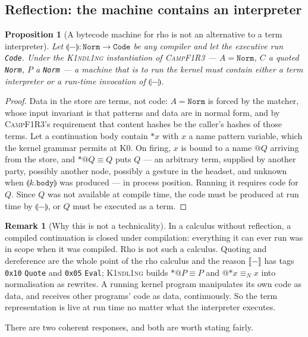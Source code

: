 \documentclass[11pt,a4paper]{article}
\newcommand{\code}[1]{\texttt{#1}}
\newcommand{\Kind}{\textsc{K1ndl1ng}}
\newcommand{\Camp}{\textsc{CampF1R3}}
\newcommand{\enc}[1]{\llbracket #1 \rrbracket}
\newcommand{\cmp}[1]{\llparenthesis #1 \rrparenthesis}
\newcommand{\Norm}{\code{Norm}}
\theoremstyle{definition}
\newtheorem{remark}[definition]{Remark}
\theoremstyle{plain}
\newtheorem{proposition}[definition]{Proposition}
\begin{document}
\subsection{Reflection: the machine contains an interpreter}\label{sec:refl}

\begin{proposition}[A bytecode machine for rho is not an alternative to a term
interpreter]\label{prop:refl}
Let $\cmp{-}:\Norm\to\code{Code}$ be any compiler and let the executive run
\code{Code}. Under the \Kind{} instantiation of \Camp{} --- $A=\Norm$,
$C$ a quoted \Norm, $P$ a \Norm{} --- a machine that is to run the kernel must
contain either a term interpreter or a run-time invocation of $\cmp{-}$.
\end{proposition}
\begin{proof}
Data in the store are terms, not code: $A=\Norm$ is forced by the matcher, whose
input invariant is that patterns and data are in normal form, and by \Camp's
requirement that content hashes be the caller's hashes of those terms. Let a
continuation body contain $*x$ with $x$ a name pattern variable, which the
kernel grammar permits at K0. On firing, $x$ is bound to a name $@Q$ arriving
from the store, and $*@Q\equiv Q$ puts $Q$ --- an arbitrary term, supplied by
another party, possibly another node, possibly a gesture in the headset, and
unknown when $\cmp{k.\code{body}}$ was produced --- in process position. Running
it requires code for $Q$. Since $Q$ was not available at compile time, the code
must be produced at run time by $\cmp{-}$, or $Q$ must be executed as a term.
\end{proof}

\begin{remark}[Why this is not a technicality]
In a calculus without reflection, a compiled continuation is closed under
compilation: everything it can ever run was in scope when it was compiled.
Rho is not such a calculus. Quoting and dereference are the whole point of the
rho calculus and the reason $\enc{-}$ has tags \code{0x10} \code{Quote} and
\code{0x05} \code{Eval}; \Kind{} builds $*@P\equiv P$ and $@{*x}\equiv_N x$ into
normalisation as rewrites. A running kernel program manipulates its own code as
data, and receives other programs' code as data, continuously. So the term
representation is live at run time no matter what the interpreter executes.
\end{remark}

\noindent
There are two coherent responses, and both are worth stating fairly.
\end{document}
